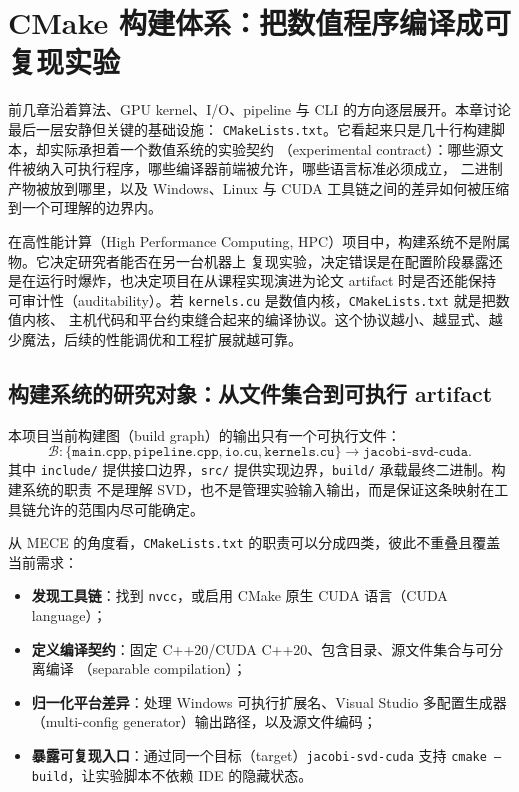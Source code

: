 \section{CMake 构建体系：把数值程序编译成可复现实验}

前几章沿着算法、GPU kernel、I/O、pipeline 与 CLI 的方向逐层展开。本章讨论最后一层安静但关键的基础设施：
\texttt{CMakeLists.txt}。它看起来只是几十行构建脚本，却实际承担着一个数值系统的实验契约
（experimental contract）：哪些源文件被纳入可执行程序，哪些编译器前端被允许，哪些语言标准必须成立，
二进制产物被放到哪里，以及 Windows、Linux 与 CUDA 工具链之间的差异如何被压缩到一个可理解的边界内。

在高性能计算（High Performance Computing, HPC）项目中，构建系统不是附属物。它决定研究者能否在另一台机器上
复现实验，决定错误是在配置阶段暴露还是在运行时爆炸，也决定项目在从课程实现演进为论文 artifact 时是否还能保持
可审计性（auditability）。若 \texttt{kernels.cu} 是数值内核，\texttt{CMakeLists.txt} 就是把数值内核、
主机代码和平台约束缝合起来的编译协议。这个协议越小、越显式、越少魔法，后续的性能调优和工程扩展就越可靠。

\subsection{构建系统的研究对象：从文件集合到可执行 artifact}

本项目当前构建图（build graph）的输出只有一个可执行文件：
\[
    \mathcal{B}:
    \{\texttt{main.cpp},\texttt{pipeline.cpp},\texttt{io.cu},\texttt{kernels.cu}\}
    \longrightarrow
    \texttt{jacobi-svd-cuda}.
\]
其中 \texttt{include/} 提供接口边界，\texttt{src/} 提供实现边界，\texttt{build/} 承载最终二进制。构建系统的职责
不是理解 SVD，也不是管理实验输入输出，而是保证这条映射在工具链允许的范围内尽可能确定。

从 MECE 的角度看，\texttt{CMakeLists.txt} 的职责可以分成四类，彼此不重叠且覆盖当前需求：
\begin{itemize}
    \item \textbf{发现工具链}：找到 \texttt{nvcc}，或启用 CMake 原生 CUDA 语言（CUDA language）；
    \item \textbf{定义编译契约}：固定 C++20/CUDA C++20、包含目录、源文件集合与可分离编译
          （separable compilation）；
    \item \textbf{归一化平台差异}：处理 Windows 可执行扩展名、Visual Studio 多配置生成器
          （multi-config generator）输出路径，以及源文件编码；
    \item \textbf{暴露可复现入口}：通过同一个目标（target）\texttt{jacobi-svd-cuda} 支持
          \texttt{cmake --build}，让实验脚本不依赖 IDE 的隐藏状态。
\end{itemize}

